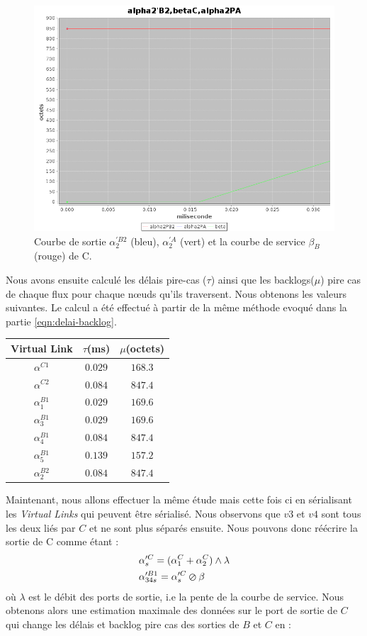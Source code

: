 \begin{figure}[!ht]%
\centering%
\noindent\includegraphics[width = .4\textwidth]{./II/images/alpha2PB2.png}%
\caption{\label{fig:alpha2PB2}Courbe de sortie $\alpha_2^{'B2}$ (bleu), $\alpha_2^{'A}$ (vert) et la courbe de service $\beta_B$ (rouge) de C.}%
\end{figure}
\newpage 
Nous avons ensuite calculé les délais pire-cas ($\tau$) ainsi que les backlogs($\mu$) pire cas de chaque flux pour chaque nœuds qu'ils traversent. Nous obtenons les valeurs suivantes. Le calcul a été effectué à partir de la même méthode evoqué dans la partie \ref{eqn:delai-backlog}.
\begin{center}
\begin{tabular}{|c|c|c|}
\hline
Virtual Link& $\tau$(ms)& $\mu$(octets)\\
\hline
$\alpha^{C1} $   & $0.029$& $168.3$\\
$\alpha^{C2} $ 	 & $0.084$& $847.4$\\
$\alpha^{B1}_1 $ & $0.029$& $169.6$\\
$\alpha^{B1}_3 $ & $0.029$& $169.6$\\
$\alpha^{B1}_4 $ & $0.084$& $847.4$\\
$\alpha^{B1}_5 $ & $0.139$& $157.2$\\
$\alpha^{B2}_2 $ & $0.084$& $847.4$\\
\hline
\end{tabular}
\end{center}
Maintenant, nous allons effectuer la même étude mais cette fois ci en sérialisant les \emph{Virtual Links} qui peuvent être sérialisé. Nous observons que $v3$ et $v4$ sont tous les deux liés par $C$ et ne sont plus séparés ensuite. Nous pouvons donc réécrire la sortie de C comme étant :
\begin{align*}
&\alpha'^C_s = (\alpha^C_1 + \alpha^C_2) \land \lambda\\ 
&\alpha'^{B1}_{34s} = \alpha'^C_s \varoslash \beta 
\end{align*} où $\lambda$ est le débit des ports de sortie, i.e la pente de la courbe de service. Nous obtenons alors une estimation maximale des données sur le port de sortie de $C$ qui change les délais et backlog pire cas des sorties de $B$ et $C$ en :

